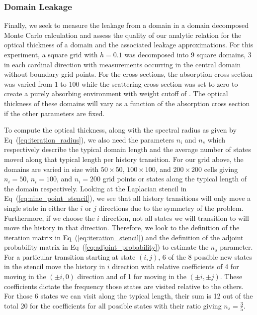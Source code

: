 \subsubsection{Domain Leakage}
\label{subsubsec:domain_leakage}
Finally, we seek to measure the leakage from a domain in a domain
decomposed Monte Carlo calculation and assess the quality of our
analytic relation for the optical thickness of a domain and the
associated leakage approximations. For this experiment, a square grid
with $h=0.1$ was decomposed into 9 square domains, 3 in each cardinal
direction with measurements occurring in the central domain without
boundary grid points. For the cross sections, the absorption cross
section was varied from 1 to 100 while the scattering cross
section was set to zero to create a purely absorbing environment
with weight cutoff of . The optical thickness of these
domains will vary as a function of the absorption cross section if
the other parameters are fixed. 

To compute the optical thickness, along with the spectral radius as
given by Eq~(\ref{eq:iteration_radius}), we also need the parameters
$n_i$ and $n_s$ which respectively describe the typical domain length
and the average number of states moved along that typical length per
history transition. For our grid above, the domains are varied in size
with $50 \times 50$, $100 \times 100$, and $200 \times 200$ cells
giving $n_i=50$, $n_i=100$, and $n_i=200$ grid points or states along
the typical length of the domain respectively. Looking at the
Laplacian stencil in Eq~(\ref{eq:nine_point_stencil}), we see that all
history transitions will only move a single state in either the $i$ or
$j$ directions due to the symmetry of the problem. Furthermore, if we
choose the $i$ direction, not all states we will transition to will
move the history in that direction. Therefore, we look to the
definition of the iteration matrix in Eq~(\ref{eq:iteration_stencil})
and the definition of the adjoint probability matrix in
Eq~(\ref{eq:adjoint_probability}) to estimate the $n_s$ parameter. For
a particular transition starting at state $(i,j)$, 6 of the 8 possible
new states in the stencil move the history in $i$ direction with
relative coefficients of 4 for moving in the $(\pm i,0)$ direction and
of 1 for moving in the $(\pm i,\pm j)$. These coefficients dictate the
frequency those states are visited relative to the others. For those 6
states we can visit along the typical length, their sum is 12 out of
the total 20 for the coefficients for all possible states with their
ratio giving $n_s = \frac{3}{5}$.


